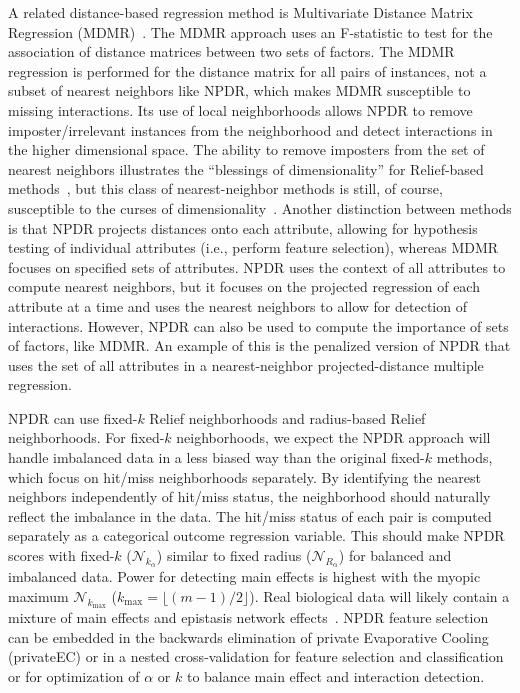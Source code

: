 \documentclass{bioinfo}
\begin{document}
A related distance-based regression method is Multivariate Distance Matrix Regression (MDMR)~\cite{schork12}.
The MDMR approach uses an F-statistic to test for the association of distance matrices between two sets of factors.
The MDMR regression is performed for the distance matrix for all pairs of instances, not a subset of nearest neighbors like NPDR, which makes MDMR susceptible to missing interactions.
Its use of local neighborhoods allows NPDR to remove imposter/irrelevant instances from the neighborhood and detect interactions in the higher dimensional space. 
The ability to remove imposters from the set of nearest neighbors illustrates the ``blessings of dimensionality'' for Relief-based methods~\cite{bod}, but this class of nearest-neighbor methods is still, of course, susceptible to the curses of dimensionality~\cite{CoD}.
Another distinction between methods is that NPDR projects distances onto each attribute, allowing for hypothesis testing of individual attributes (i.e., perform feature selection), whereas MDMR focuses on specified sets of attributes.
NPDR uses the context of all attributes to compute nearest neighbors, but it focuses on the projected regression of each attribute at a time and uses the nearest neighbors to allow for detection of interactions. However, NPDR can also be used to compute the importance of sets of factors, like MDMR.
An example of this is the penalized version of NPDR that uses the set of all attributes in a nearest-neighbor projected-distance multiple regression.

NPDR can use fixed-$k$ Relief neighborhoods and radius-based Relief neighborhoods.
For fixed-$k$ neighborhoods, we expect the NPDR approach will handle imbalanced data in a less biased way than the original fixed-$k$ methods, which focus on hit/miss neighborhoods separately.
By identifying the nearest neighbors independently of hit/miss status, the neighborhood should naturally reflect the imbalance in the data.
The hit/miss status of each pair is computed separately as a categorical outcome regression variable.
This should make NPDR scores with fixed-$k$ ($\mathcal{N}_{k_\alpha}$) similar to fixed radius ($\mathcal{N}_{R_\alpha}$) for balanced and imbalanced data.
Power for detecting main effects is highest with the myopic maximum $\mathcal{N}_{k_\text{max}}$ ($k_{\text{max}}=\lfloor (m-1)/2\rfloor$).
Real biological data will likely contain a mixture of main effects and epistasis network effects~\cite{mckinney_pajewski}.
NPDR feature selection can be embedded in the backwards elimination of private Evaporative Cooling (privateEC) or in a nested cross-validation for feature selection and classification~\cite{le17} or for optimization of $\alpha$ or $k$ to balance main effect and interaction detection.
\end{document}
